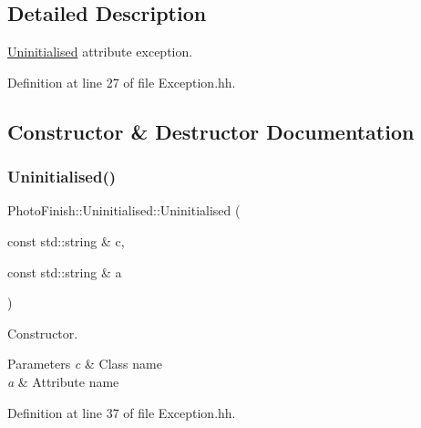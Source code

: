 \subsection{Detailed Description}
\hyperlink{class_photo_finish_1_1_uninitialised}{Uninitialised} attribute exception. 

Definition at line 27 of file Exception.\+hh.



\subsection{Constructor \& Destructor Documentation}
\mbox{\label{class_photo_finish_1_1_uninitialised_a83de97d09eee169849b36c340d97f57b}} 
\subsubsection{\texorpdfstring{Uninitialised()}{Uninitialised()}\hspace{0.1cm}{\footnotesize\ttfamily [1/2]}}
{\footnotesize\ttfamily Photo\+Finish\+::\+Uninitialised\+::\+Uninitialised (\begin{DoxyParamCaption}\item[{const std\+::string \&}]{c,  }\item[{const std\+::string \&}]{a }\end{DoxyParamCaption})\hspace{0.3cm}{\ttfamily [inline]}}



Constructor. 


\begin{DoxyParams}{Parameters}
{\em c} & Class name \\
\hline
{\em a} & Attribute name \\
\hline
\end{DoxyParams}


Definition at line 37 of file Exception.\+hh.

\mbox{\label{class_photo_finish_1_1_uninitialised_a5c1fe051480928e211eb166f3e689d4f}} 
